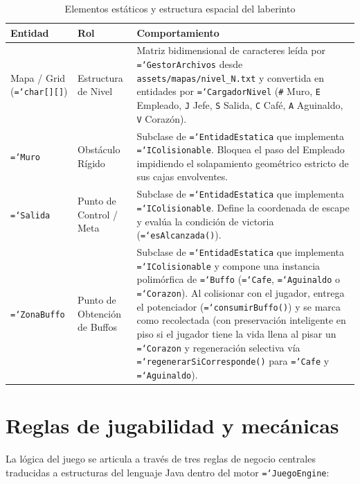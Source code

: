 \documentclass[12pt, a4paper]{article}
\DeclareRobustCommand{\code}[1]{\textcolor{codegreen}{\texttt{\hyphenchar\font=`\-#1}}}
\begin{document}
\begin{table}[H]
\caption{Elementos estáticos y estructura espacial del laberinto}
\begin{tabularx}{\textwidth}{@{} >{\raggedright\arraybackslash}p{2.9cm} >{\raggedright\arraybackslash}p{3.5cm} >{\raggedright\arraybackslash}X @{}}
\toprule
\textbf{Entidad} & \textbf{Rol} & \textbf{Comportamiento} \\
\midrule
Mapa / Grid (\code{char[][]}) & Estructura de Nivel & Matriz bidimensional de caracteres leída por \code{GestorArchivos} desde \texttt{assets/mapas/nivel\_N.txt} y convertida en entidades por \code{CargadorNivel} (\texttt{\#} Muro, \texttt{E} Empleado, \texttt{J} Jefe, \texttt{S} Salida, \texttt{C} Café, \texttt{A} Aguinaldo, \texttt{V} Corazón). \\
\addlinespace[5pt]
\code{Muro} & Obstáculo Rígido & Subclase de \code{EntidadEstatica} que implementa \code{IColisionable}. Bloquea el paso del Empleado impidiendo el solapamiento geométrico estricto de sus cajas envolventes. \\
\addlinespace[5pt]
\code{Salida} & Punto de Control / Meta & Subclase de \code{EntidadEstatica} que implementa \code{IColisionable}. Define la coordenada de escape y evalúa la condición de victoria (\code{esAlcanzada()}). \\
\addlinespace[5pt]
\code{ZonaBuffo} & Punto de Obtención de Buffos & Subclase de \code{EntidadEstatica} que implementa \code{IColisionable} y compone una instancia polimórfica de \code{Buffo} (\code{Cafe}, \code{Aguinaldo} o \code{Corazon}). Al colisionar con el jugador, entrega el potenciador (\code{consumirBuffo()}) y se marca como recolectada (con preservación inteligente en piso si el jugador tiene la vida llena al pisar un \code{Corazon} y regeneración selectiva vía \code{regenerarSiCorresponde()} para \code{Cafe} y \code{Aguinaldo}). \\
\bottomrule
\end{tabularx}
\end{table}

\section{Reglas de jugabilidad y mecánicas}

La lógica del juego se articula a través de tres reglas de negocio centrales traducidas a estructuras del lenguaje Java dentro del motor \code{JuegoEngine}:
\end{document}

